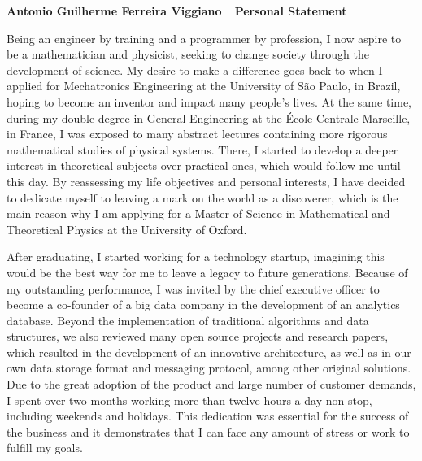 \documentclass[10pt]{article}
\def\firstname{Antonio Guilherme }
\def\familyname{Ferreira Viggiano}
\def\subj{Personal Statement}
\def\FileTitle{\firstname\familyname~\textemdash~\subj}
\begin{document}
\sffamily %

{\bfseries \FileTitle}



Being an engineer by training and a programmer by profession, I now aspire to be a mathematician and physicist, seeking to change society through the development of science. My desire to make a difference goes back to when I applied for Mechatronics Engineering at the University of São Paulo, in Brazil, hoping to become an inventor and impact many people's lives. At the same time, during my double degree in General Engineering at the École Centrale Marseille, in France, I was exposed to many abstract lectures containing more rigorous mathematical studies of physical systems. There, I started to develop a deeper interest in theoretical subjects over practical ones, which would follow me until this day. By reassessing my life objectives and personal interests, I have decided to dedicate myself to leaving a mark on the world as a discoverer, which is the main reason why I am applying for a Master of Science in Mathematical and Theoretical Physics at the University of Oxford.

After graduating, I started working for a technology startup, imagining this would be the best way for me to leave a legacy to future generations. Because of my outstanding performance, I was invited by the chief executive officer to become a co-founder of a big data company in the development of an analytics database. Beyond the implementation of traditional algorithms and data structures, we also reviewed many open source projects and research papers, which resulted in the development of an innovative architecture, as well as in our own data storage format and messaging protocol, among other original solutions. Due to the great adoption of the product and large number of customer demands, I spent over two months working more than twelve hours a day non-stop, including weekends and holidays. This dedication was essential for the success of the business and it demonstrates that I can face any amount of stress or work to fulfill my goals.
\end{document}

